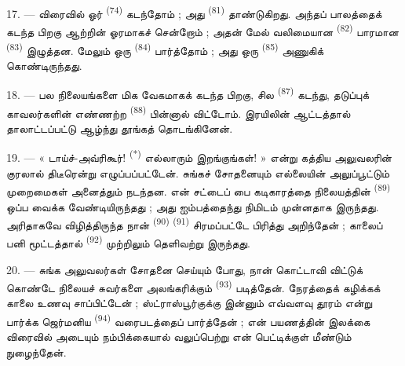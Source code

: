 17. --- விரைவில் ஓர்  \textsuperscript{(74)}
கடந்தோம் ; அது  \textsuperscript{(81)} தாண்டுகிறது.
அந்தப் பாலத்தைக் கடந்த பிறகு ஆற்றின் ஓரமாகச் சென்றோம் ; அதன் மேல்
வலிமையான  \textsuperscript{(82)} பாரமான
 \textsuperscript{(83)} இழுத்தன. மேலும் ஒரு
 \textsuperscript{(84)} பார்த்தோம் ; அது ஒரு
 \textsuperscript{(85)} அணுகிக் கொண்டிருந்தது.

18. --- பல நிலையங்களை மிக வேகமாகக் கடந்த பிறகு, சில  \textsuperscript{(87)} கடந்து, தடுப்புக் காவலர்களின்
எண்ணற்ற  \textsuperscript{(88)} பின்னால் விட்டோம்.
இரயிலின் ஆட்டத்தால் தாலாட்டப்பட்டு ஆழ்ந்து தூங்கத் தொடங்கினேன்.

\VUsaut{3.0mm}
\VUsaut{3.0mm}

19. --- « டாய்ச்-அவ்ரிகூர்! \textsuperscript{(*)} எல்லாரும்
இறங்குங்கள்! » என்று கத்திய அலுவலரின் குரலால் திடீரென்று
எழுப்பப்பட்டேன். சுங்கச் சோதனையும் எல்லையின் அலுப்பூட்டும்
முறைமைகள் அனைத்தும் நடந்தன. என் சட்டைப் பை கடிகாரத்தை நிலையத்தின்
 \textsuperscript{(89)} ஒப்ப வைக்க
வேண்டியிருந்தது ; அது ஐம்பத்தைந்து நிமிடம் முன்னதாக இருந்தது.
அரிதாகவே விழித்திருந்த நான் 
\textsuperscript{(90)}  \textsuperscript{(91)}
சிரமப்பட்டே பிரித்து அறிந்தேன் ; காலைப் பனி மூட்டத்தால்
 \textsuperscript{(92)} முற்றிலும் தெளிவற்று
இருந்தது.

20. --- சுங்க அலுவலர்கள் சோதனை செய்யும் போது, நான் கொட்டாவி
விட்டுக் கொண்டே நிலையச் சுவர்களை அலங்கரிக்கும்  \textsuperscript{(93)} படித்தேன். நேரத்தைக் கழிக்கக் காலை
உணவு சாப்பிட்டேன் ; ஸ்ட்ராஸ்பூர்குக்கு இன்னும் எவ்வளவு தூரம் என்று
பார்க்க ஜெர்மனிய  \textsuperscript{(94)}
வரைபடத்தைப் பார்த்தேன் ; என் பயணத்தின் இலக்கை விரைவில் அடையும்
நம்பிக்கையால் வலுப்பெற்று என் பெட்டிக்குள் மீண்டும் நுழைந்தேன்.

\VUsaut{6.0mm}
\VUfilet{22mm}
